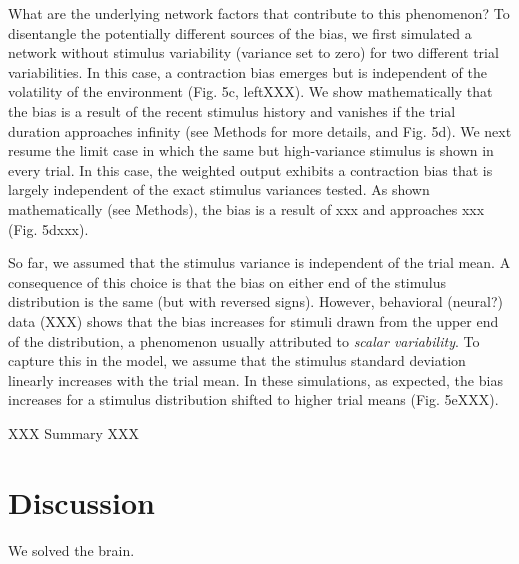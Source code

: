 \documentclass[10pt,a4paper,draft]{article}
\begin{document}
What are the underlying network factors that contribute to this phenomenon? To disentangle the potentially different sources of the bias, we first simulated a network without stimulus variability (variance set to zero) for two different trial variabilities. In this case, a contraction bias emerges but is independent of the volatility of the environment (Fig. 5c, leftXXX). We show mathematically that the bias is a result of the recent stimulus history and vanishes if the trial duration approaches infinity (see Methods for more details, and Fig. 5d). We next resume the limit case in which the same but high-variance stimulus is shown in every trial. In this case, the weighted output exhibits a contraction bias that is largely independent of the exact stimulus variances tested. As shown mathematically (see Methods), the bias is a result of xxx and approaches xxx (Fig. 5dxxx). 

So far, we assumed that the stimulus variance is independent of the trial mean. A consequence of this choice is that the bias on either end of the stimulus distribution is the same (but with reversed signs). However, behavioral (neural?) data (XXX) shows that the bias increases for stimuli drawn from the upper end of the distribution, a phenomenon usually attributed to \textit{scalar variability}. To capture this in the model, we assume that the stimulus standard deviation linearly increases with the trial mean. In these simulations, as expected, the bias increases for a stimulus distribution shifted to higher trial means (Fig. 5eXXX).

XXX Summary XXX


\section*{Discussion}

We solved the brain.

\end{document}
